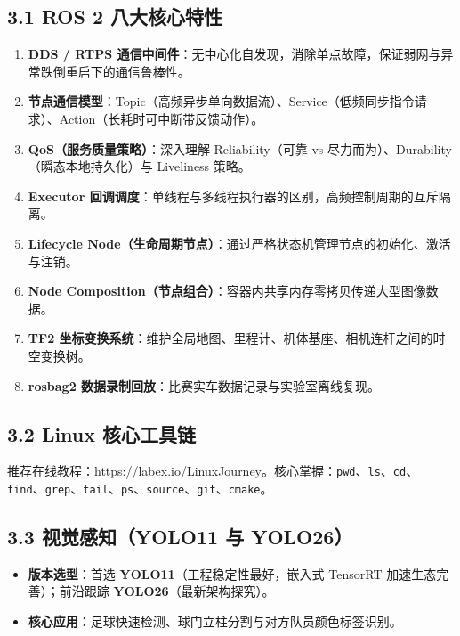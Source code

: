 \documentclass[11pt,a4paper]{ctexart}
\begin{document}
\subsection{3.1 ROS 2 八大核心特性}
\begin{enumerate}[leftmargin=*]
    \item \textbf{DDS / RTPS 通信中间件}：无中心化自发现，消除单点故障，保证弱网与异常跌倒重启下的通信鲁棒性。
    \item \textbf{节点通信模型}：Topic（高频异步单向数据流）、Service（低频同步指令请求）、Action（长耗时可中断带反馈动作）。
    \item \textbf{QoS（服务质量策略）}：深入理解 Reliability（可靠 vs 尽力而为）、Durability（瞬态本地持久化）与 Liveliness 策略。
    \item \textbf{Executor 回调调度}：单线程与多线程执行器的区别，高频控制周期的互斥隔离。
    \item \textbf{Lifecycle Node（生命周期节点）}：通过严格状态机管理节点的初始化、激活与注销。
    \item \textbf{Node Composition（节点组合）}：容器内共享内存零拷贝传递大型图像数据。
    \item \textbf{TF2 坐标变换系统}：维护全局地图、里程计、机体基座、相机连杆之间的时空变换树。
    \item \textbf{rosbag2 数据录制回放}：比赛实车数据记录与实验室离线复现。
\end{enumerate}

\subsection{3.2 Linux 核心工具链}
推荐在线教程：\url{https://labex.io/LinuxJourney}。核心掌握：\texttt{pwd}、\texttt{ls}、\texttt{cd}、\texttt{find}、\texttt{grep}、\texttt{tail}、\texttt{ps}、\texttt{source}、\texttt{git}、\texttt{cmake}。

\subsection{3.3 视觉感知（YOLO11 与 YOLO26）}
\begin{itemize}[leftmargin=*]
    \item \textbf{版本选型}：首选 \textbf{YOLO11}（工程稳定性最好，嵌入式 TensorRT 加速生态完善）；前沿跟踪 \textbf{YOLO26}（最新架构探究）。
    \item \textbf{核心应用}：足球快速检测、球门立柱分割与对方队员颜色标签识别。
\end{itemize}
\end{document}
